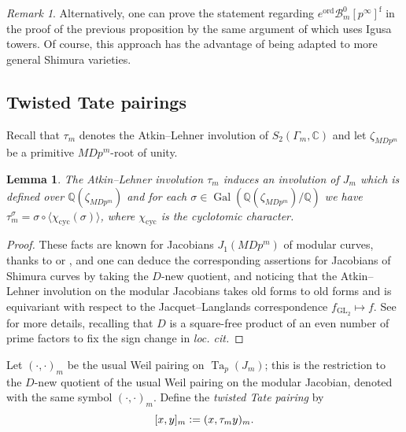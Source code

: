 \documentclass[a4paper,11pt]{amsart}
\numberwithin{equation}{section}
\theoremstyle{plain}
\newtheorem{lemma}[theorem]{Lemma}
\theoremstyle{definition}
\theoremstyle{remark}
\newtheorem{remark}[theorem]{Remark}
\newcommand{\Q}{\mathbb{Q}}
\newcommand{\C}{\mathbb{C}}
\newcommand{\defeq}{\vcentcolon=}
\DeclareMathOperator{\Gal}{Gal}
\DeclareMathOperator{\Ta}{Ta}
\newcommand{\cyc}{{\mathrm{cyc}}}
\newcommand{\ord}{\mathrm{ord}}
\begin{document}
\begin{remark}
Alternatively, one can prove the statement regarding $e^\ord \mathcal{B}^0_m[p^\infty]^\mathrm{f}$ 
in the proof of the previous proposition by the same argument of \cite[Proposition (1.2.4)]{OhtaMA} which uses Igusa towers. Of course, this approach has the advantage of being adapted to more general Shimura varieties. 
\end{remark}

\subsection{Twisted Tate pairings} 
Recall that $\tau_m$ denotes the Atkin--Lehner involution of $S_2(\Gamma_m,\C)$ and let $\zeta_{MDp^m}$ be a primitive $MDp^m$-root of unity.

\begin{lemma}\label{lemmmaAL}
   The Atkin--Lehner involution $\tau_m$ induces an involution of $J_m$ which is defined over $\Q(\zeta_{MDp^m})$ and for each $\sigma\in \Gal(\Q(\zeta_{MDp^m})/\Q)$ we have $\tau_m^\sigma=\sigma\circ\langle \chi_\cyc(\sigma)\rangle$, where $\chi_\cyc$ is the cyclotomic character.
\end{lemma}
\begin{proof}
   These facts are known for Jacobians $J_1(MDp^m)$ of modular curves, 
thanks to \cite[Proposition 7.8]{Shimura78} or \cite[\S3.1]{OhtaC}, and one can deduce the corresponding assertions for Jacobians of Shimura curves by taking the $D$-new quotient, and noticing that 
the Atkin--Lehner involution on the modular Jacobians takes old forms to old forms and is equivariant with respect to the Jacquet--Langlands correspondence $f_{\mathrm{GL}_2}\mapsto f$. See \cite[Theorem 1.2]{BD96} for more details, recalling that $D$ is a square-free product of an even number of prime factors to fix the sign change in \emph{loc. cit.}  
\end{proof}

Let $(\cdot,\cdot)_m$ be the usual Weil pairing on $\Ta_p(J_m)$; this is the restriction to the 
$D$-new quotient of the usual Weil pairing on the modular Jacobian, denoted with the same symbol $(\cdot,\cdot)_m$. 
Define the \emph{twisted Tate pairing} by \[[x,y]_m\defeq (x,\tau_my)_m.\] 
\end{document}
